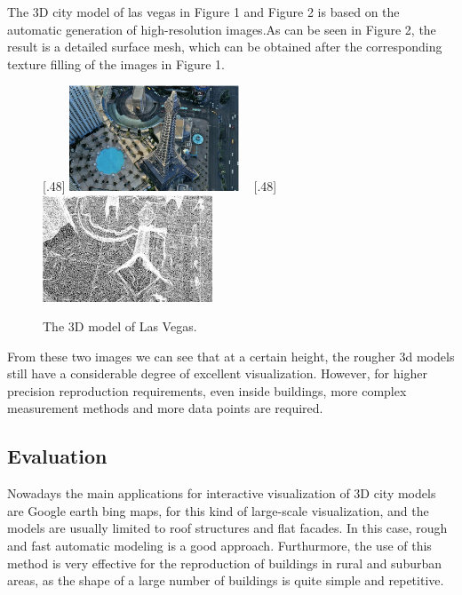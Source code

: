 The 3D city model of las vegas in Figure 1 and Figure 2 is based on the automatic generation of high-resolution images.As can be seen in Figure 2, the result is a detailed surface mesh, which can be obtained after the corresponding texture filling of the images in Figure 1.

\begin{figure}[htb]
	\centering	
	[.48\linewidth]{
		\includegraphics[width=0.45\textwidth]{gfx/LasVegas_1} 	
	}  	
	~
	[.48\linewidth]{
		\includegraphics[width=0.45\textwidth]{gfx/LasVegas_2}  	
	}	  
	
	\caption{The 3D model of Las Vegas. \cite{haala2010update}}
	\label{fig:ex_2_3}
\end{figure}

From these two images we can see that at a certain height, the rougher 3d models still have a considerable degree of excellent visualization. However, for higher precision reproduction requirements, even inside buildings, more complex measurement methods and more data points are required.



\subsection{Evaluation}

Nowadays the main applications for interactive visualization of 3D city models are Google earth bing maps, for this kind of large-scale visualization, and the models are usually limited to roof structures and flat facades. In this case, rough and fast automatic modeling is a good approach. Furthurmore, the use of this method is very effective for the reproduction of buildings in rural and suburban areas, as the shape of a large number of buildings is quite simple and repetitive. 


